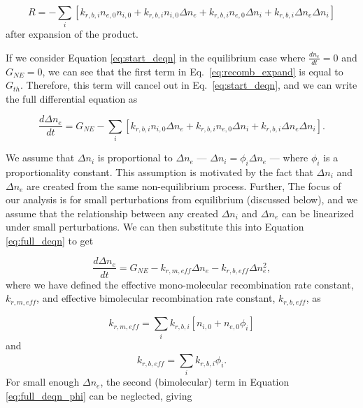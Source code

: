 \begin{equation}
  \label{eq:recomb_expand}
  R = - \sum_{i}^{}[k_{r, b, i}n_{e,0}n_{i,0}  + k_{r, b, i}n_{i,0}\Delta n_{e} + k_{r, b, i}n_{e,0}\Delta n_{i} + k_{r, b, i}\Delta n_{e}\Delta n_{i}]
\end{equation}
after expansion of the product.

If we consider Equation \ref{eq:start_deqn} in the equilibrium case where $\frac{dn_{e}}{dt} = 0$ and $G_{NE} = 0$, we can see that the first term in Eq.\ \ref{eq:recomb_expand} is equal to $G_{th}$. Therefore, this term will cancel out in Eq.\ \ref{eq:start_deqn}, and we can write the full differential equation as

\begin{equation}
  \label{eq:full_deqn}
\frac{d\Delta n_{e}}{dt} = G_{NE}  -  \sum_{i}^{}[k_{r, b, i}n_{i,0}\Delta n_{e} + k_{r, b, i}n_{e,0}\Delta n_{i} + k_{r, b, i}\Delta n_{e}\Delta n_{i}].
\end{equation}

We assume that $\Delta n_i$ is proportional to $\Delta n_e$ — $\Delta n_i = \phi_i \Delta n_{e}$ — where $\phi_i$ is a proportionality constant. This assumption is motivated by the fact that $\Delta n_i$ and $\Delta n_e$ are created from the same non-equilibrium process. Further, The focus of our analysis is for small perturbations from equilibrium (discussed below), and we assume that the relationship between any created $\Delta n_i$ and $\Delta n_e$ can be linearized under small perturbations. We can then substitute this into Equation \ref{eq:full_deqn} to get

\begin{equation}
  \label{eq:full_deqn_phi}
\frac{d\Delta n_{e}}{dt} = G_{NE} - k_{r, m, eff}\Delta n_{e} - k_{r, b, eff} \Delta n_{e}^2,
\end{equation}
where we have defined the effective mono-molecular recombination rate constant, $k_{r, m, eff}$, and effective bimolecular recombination rate constant, $k_{r, b, eff}$, as


\begin{equation}
\label{eq:krm_eff_def}
k_{r, m, eff} = \sum_{i}^{}k_{r, b, i}[n_{i,0} + n_{e,0}\phi_i]
\end{equation}
and
\begin{equation}
\label{eq:krb_eff_def}
k_{r, b, eff} = \sum_{i}^{}k_{r, b, i}\phi_i.
\end{equation}
For small enough $\Delta n_e$, the second (bimolecular) term in Equation \ref{eq:full_deqn_phi} can be neglected, giving

